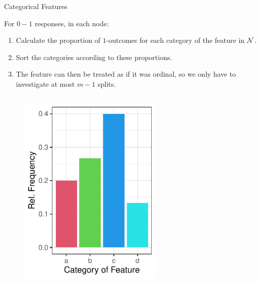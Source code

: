 \documentclass[11pt,compress,t,notes=noshow, xcolor=table]{beamer}
\begin{document}
  \begin{frame}[noframenumbering]{Categorical Features}

For $0-1$ responses, in each node:
  \begin{enumerate}
  \item Calculate the proportion of $1$-outcomes for each category of the feature in $\mathcal{N}$.
  \item Sort the categories according to these proportions.
  \item The feature can then be treated as if it was ordinal, so we only have to investigate at most $m-1$ splits.
  \end{enumerate}
  \begin{columns}
  \begin{column}{0.33\textwidth}
  \begin{figure}
  \includegraphics[width=0.8\textwidth]{figure/categoryplot-binary1.pdf}
  \end{figure}
  \end{column}
  \begin{column}{0.33\textwidth}
  \begin{figure}

\end{figure}
\end{column}
\end{columns}
\end{frame}
\end{document}
